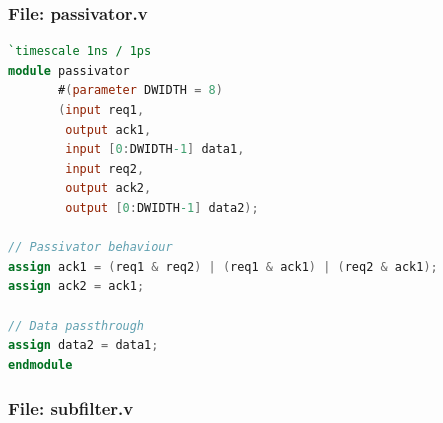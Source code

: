 \documentclass[a4paper,twoside,11pt, fleqn]{article}
\begin{document}
\subsubsection{File: passivator.v}
\begin{lstlisting}[language=Verilog]
`timescale 1ns / 1ps
module passivator
       #(parameter DWIDTH = 8)
       (input req1,
        output ack1,
        input [0:DWIDTH-1] data1,
        input req2,
        output ack2,
        output [0:DWIDTH-1] data2);

// Passivator behaviour
assign ack1 = (req1 & req2) | (req1 & ack1) | (req2 & ack1);
assign ack2 = ack1;

// Data passthrough
assign data2 = data1;
endmodule
\end{lstlisting}

\subsubsection{File: subfilter.v}
\end{document}
